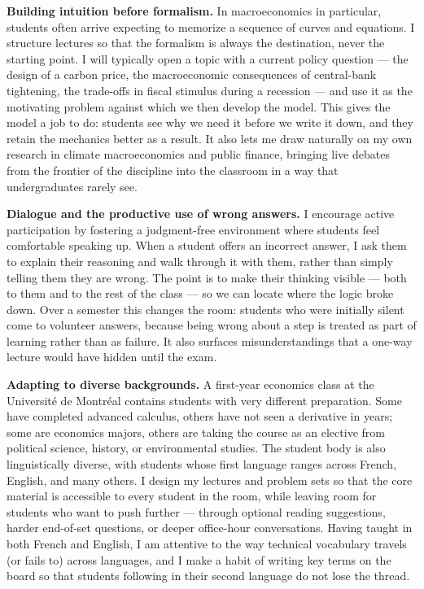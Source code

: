 \documentclass[11pt]{article}
\begin{document}
\textbf{Building intuition before formalism.}
In macroeconomics in particular, students often arrive expecting to memorize a sequence of curves and equations. I structure lectures so that the formalism is always the destination, never the starting point. I will typically open a topic with a current policy question --- the design of a carbon price, the macroeconomic consequences of central-bank tightening, the trade-offs in fiscal stimulus during a recession --- and use it as the motivating problem against which we then develop the model. This gives the model a job to do: students see why we need it before we write it down, and they retain the mechanics better as a result. It also lets me draw naturally on my own research in climate macroeconomics and public finance, bringing live debates from the frontier of the discipline into the classroom in a way that undergraduates rarely see.

\textbf{Dialogue and the productive use of wrong answers.}
I encourage active participation by fostering a judgment-free environment where students feel comfortable speaking up. When a student offers an incorrect answer, I ask them to explain their reasoning and walk through it with them, rather than simply telling them they are wrong. The point is to make their thinking visible --- both to them and to the rest of the class --- so we can locate where the logic broke down. Over a semester this changes the room: students who were initially silent come to volunteer answers, because being wrong about a step is treated as part of learning rather than as failure. It also surfaces misunderstandings that a one-way lecture would have hidden until the exam.

\textbf{Adapting to diverse backgrounds.}
A first-year economics class at the Université de Montréal contains students with very different preparation. Some have completed advanced calculus, others have not seen a derivative in years; some are economics majors, others are taking the course as an elective from political science, history, or environmental studies. The student body is also linguistically diverse, with students whose first language ranges across French, English, and many others. I design my lectures and problem sets so that the core material is accessible to every student in the room, while leaving room for students who want to push further --- through optional reading suggestions, harder end-of-set questions, or deeper office-hour conversations. Having taught in both French and English, I am attentive to the way technical vocabulary travels (or fails to) across languages, and I make a habit of writing key terms on the board so that students following in their second language do not lose the thread.
\end{document}

